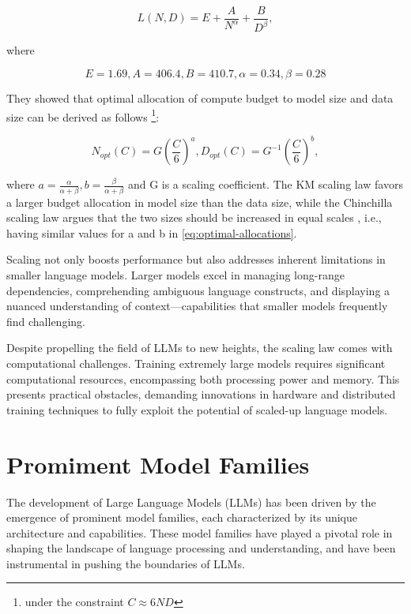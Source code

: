 {{        \[L(N,D) = E + \frac{A}{N^\alpha} + \frac{B}{D^\beta},\]

        where

        \[E=1.69, A=406.4,B = 410.7, \alpha = 0.34, \beta = 0.28\]

        They showed that optimal allocation of compute budget to model size and data size can be derived as follows \footnote{under the constraint \(C \approx 6ND\)}:

        \begin{center}
            \begin{equation}
                N_{opt}(C) = G(\frac{C}{6})^a, D_{opt}(C) = G^{-1}(\frac{C}{6})^b, \label{eq:optimal-allocations}
            \end{equation}
        \end{center}

        where \(a=\frac{\alpha}{\alpha+\beta}, b=\frac{\beta}{\alpha+\beta}\) and G is a scaling coefficient.
        The KM scaling law favors a larger budget allocation in model size than the data size, while the Chinchilla scaling law argues that the two sizes should be increased in equal scales \cite{scaling2}, i.e., having similar values for a and b in \eqref{eq:optimal-allocations}.

    }
}

Scaling not only boosts performance but also addresses inherent limitations in smaller language models.
Larger models excel in managing long-range dependencies, comprehending ambiguous language constructs, and displaying a nuanced understanding of context---capabilities that smaller models frequently find challenging.

Despite propelling the field of LLMs to new heights, the scaling law comes with computational challenges.
Training extremely large models requires significant computational resources, encompassing both processing power and memory.
This presents practical obstacles, demanding innovations in hardware and distributed training techniques to fully exploit the potential of scaled-up language models.


\section{Promiment Model Families}
\label{sec:promiment-model-families}

The development of Large Language Models (LLMs) has been driven by the emergence of prominent model families, each characterized by its unique architecture and capabilities.
These model families have played a pivotal role in shaping the landscape of language processing and understanding, and have been instrumental in pushing the boundaries of LLMs.

